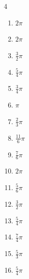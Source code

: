 \begin{multicols}{4}
\begin{enumerate}
  \item $\displaystyle 2\pi$

  \item $\displaystyle 2\pi$

  \item $\displaystyle \frac{3}{2}\pi$

  \item $\displaystyle \frac{5}{4}\pi$

  \item $\displaystyle \frac{3}{4}\pi$

  \item $\displaystyle \pi$

  \item $\displaystyle \frac{2}{3}\pi$

  \item $\displaystyle \frac{11}{6}\pi$

  \item $\displaystyle \frac{7}{6}\pi$

  \item $\displaystyle 2\pi$

  \item $\displaystyle \frac{5}{6}\pi$

  \item $\displaystyle \frac{3}{2}\pi$

  \item $\displaystyle \frac{5}{4}\pi$

  \item $\displaystyle \frac{7}{4}\pi$

  \item $\displaystyle \frac{5}{3}\pi$

  \item $\displaystyle \frac{5}{4}\pi$


\end{enumerate}
\end{multicols}
